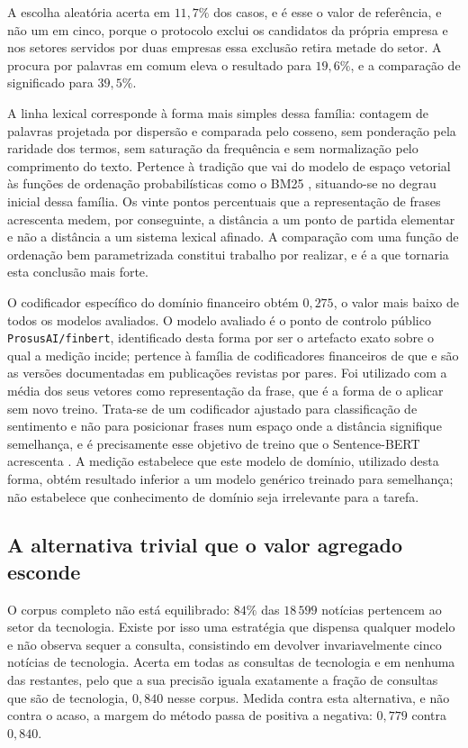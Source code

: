 A escolha aleatória acerta em $11{,}7\%$ dos casos, e é esse o valor de referência, e não um em
cinco, porque o protocolo exclui os candidatos da própria empresa e nos setores servidos por duas
empresas essa exclusão retira metade do setor. A procura por palavras em comum eleva o resultado
para $19{,}6\%$, e a comparação de significado para $39{,}5\%$.

A linha lexical corresponde à forma mais simples dessa família: contagem de palavras projetada por
dispersão e comparada pelo cosseno, sem ponderação pela raridade dos termos, sem saturação da
frequência e sem normalização pelo comprimento do texto. Pertence à tradição que vai do modelo de
espaço vetorial \autocite{salton1975vsm} às funções de ordenação probabilísticas como o BM25
\autocite{robertson2009bm25}, situando-se no degrau inicial dessa família. Os vinte pontos
percentuais que a representação de frases \autocite{reimers2019sbert} acrescenta medem, por
conseguinte, a distância a um ponto de partida elementar e não a distância a um sistema lexical
afinado. A comparação com uma função de ordenação bem parametrizada constitui trabalho por realizar,
e é a que tornaria esta conclusão mais forte.

O codificador específico do domínio financeiro obtém $0{,}275$, o valor mais baixo de todos os
modelos avaliados. O modelo avaliado é o ponto de controlo público \texttt{ProsusAI/finbert},
identificado desta forma por ser o artefacto exato sobre o qual a medição incide; pertence à
família de codificadores financeiros de que \textcite{liu2020finbert} e \textcite{huang2023finbert}
são as versões documentadas em publicações revistas por pares. Foi utilizado com a média dos seus vetores como
representação da frase, que é a forma de o aplicar sem novo treino. Trata-se de um codificador
ajustado para classificação de sentimento e não para posicionar frases num espaço onde a distância
signifique semelhança, e é precisamente esse objetivo de treino que o Sentence-BERT acrescenta
\autocite{reimers2019sbert}. A medição estabelece que este modelo de domínio, utilizado desta forma,
obtém resultado inferior a um modelo genérico treinado para semelhança; não estabelece que
conhecimento de domínio seja irrelevante para a tarefa.

\subsection{A alternativa trivial que o valor agregado esconde}

O corpus completo não está equilibrado: $84\%$ das $18\,599$ notícias pertencem ao setor da
tecnologia. Existe por isso uma estratégia que dispensa qualquer modelo e não observa sequer a
consulta, consistindo em devolver invariavelmente cinco notícias de tecnologia. Acerta em todas as
consultas de tecnologia e em nenhuma das restantes, pelo que a sua precisão iguala exatamente a
fração de consultas que são de tecnologia, $0{,}840$ nesse corpus. Medida contra esta alternativa,
e não contra o acaso, a margem do método passa de positiva a negativa: $0{,}779$ contra $0{,}840$.

